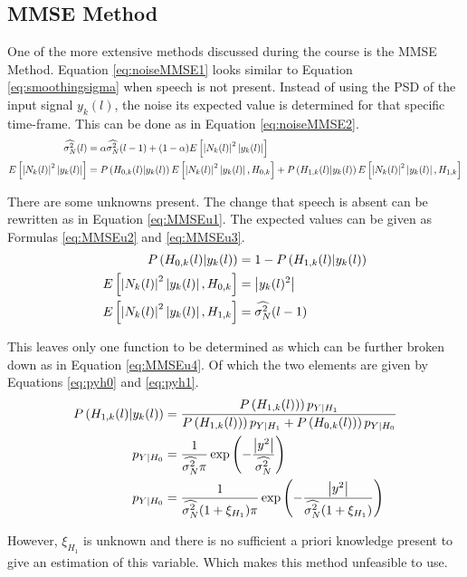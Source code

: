 
\subsection{MMSE Method}
One of the more extensive methods discussed during the course is the MMSE Method. Equation \ref{eq:noiseMMSE1} looks similar to Equation \ref{eq:smoothingsigma} when speech is not present. Instead of using the PSD of the input signal $y_k(l)$, the noise its expected value is determined for that specific time-frame. This can be done as in Equation \ref{eq:noiseMMSE2}.
\begin{align}
  \widehat{\sigma_{N}^{2}}(l) &= \alpha \widehat{\sigma_{N}^{2}}(l-1) + (1-\alpha)E\left[ \abs{N_{k}(l)}^{2}\abs{y_{k}(l)}\right]
  \label{eq:noiseMMSE1} \\
  E\left[ \abs{N_{k}(l)}^{2}\abs{y_{k}(l)}\right] &=
  P\left(H_{0,k}(l)|y_{k}(l)\right) E\left[\abs{N_{k}(l)}^{2}\abs{y_{k}(l)},H_{0,k}\right] +
  P\left(H_{1,k}(l)|y_{k}(l)\right) E\left[\abs{N_{k}(l)}^{2}\abs{y_{k}(l)},H_{1,k}\right]
  \label{eq:noiseMMSE2}
\end{align}

There are some unknowns present. The change that speech is absent can be rewritten as in Equation \ref{eq:MMSEu1}. The expected values can be given as Formulas \ref{eq:MMSEu2} and \ref{eq:MMSEu3}.
\begin{align}
  P\left(H_{0,k}(l)|y_{k}(l)\right) &= 1 - P\left(H_{1,k}(l)|y_{k}(l)\right)
  \label{eq:MMSEu1} \\
  E\left[\abs{N_{k}(l)}^{2}\abs{y_{k}(l)},H_{0,k}\right] &= \abs{y_{k}(l)^{2}}
  \label{eq:MMSEu2} \\
  E\left[\abs{N_{k}(l)}^{2}\abs{y_{k}(l)},H_{1,k}\right] &= \widehat{\sigma_{N}^{2}}(l-1)
  \label{eq:MMSEu3}
\end{align}

This leaves only one function to be determined as which can be further broken down as in Equation \ref{eq:MMSEu4}. Of which the two elements are given by Equations \ref{eq:pyh0} and \ref{eq:pyh1}.
\begin{align}
  P\left(H_{1,k}(l)|y_{k}(l)\right) &= \frac{P\left(H_{1,k}(l))\right)p_{Y|H_{1}}}{P\left(H_{1,k}(l))\right)p_{Y|H_{1}} + P\left(H_{0,k}(l))\right)p_{Y|H_{0}}}
  \label{eq:MMSEu4}\\
  p_{Y|H_{0}} &= \frac{1}{\widehat{\sigma_{N}^{2}} \pi} \exp\left(-\frac{\abs{y^{2}}}{\widehat{\sigma_{N}^{2}}}\right)
  \label{eq:pyh0}\\
  p_{Y|H_{0}} &= \frac{1}{\widehat{\sigma_{N}^{2}} (1+\xi_{H_{1}})\pi} \exp\left(-\frac{\abs{y^{2}}}{\widehat{\sigma_{N}^{2}}(1+\xi_{H_{1}})}\right)
  \label{eq:pyh1}
\end{align}

However, $\xi_{H_{1}}$ is unknown and there is no sufficient a priori knowledge present to give an estimation of this variable. Which makes this method unfeasible to use.